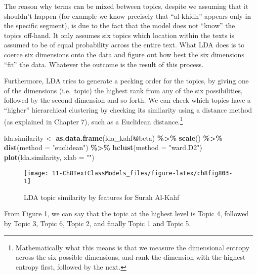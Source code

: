 \documentclass[
]{article}
\newenvironment{Shaded}{\begin{snugshade}}{\end{snugshade}}
\newcommand{\AttributeTok}[1]{\textcolor[rgb]{0.13,0.29,0.53}{#1}}
\newcommand{\FunctionTok}[1]{\textcolor[rgb]{0.13,0.29,0.53}{\textbf{#1}}}
\newcommand{\NormalTok}[1]{#1}
\newcommand{\OtherTok}[1]{\textcolor[rgb]{0.56,0.35,0.01}{#1}}
\newcommand{\SpecialCharTok}[1]{\textcolor[rgb]{0.81,0.36,0.00}{\textbf{#1}}}
\newcommand{\StringTok}[1]{\textcolor[rgb]{0.31,0.60,0.02}{#1}}
\begin{document}
The reason why terms can be mixed between topics, despite we assuming that it shouldn't happen (for example we know precisely that ``al-khidh'' appears only in the specific segment), is due to the fact that the model does not ``know'' the topics off-hand. It only assumes six topics which location within the texts is assumed to be of equal probability across the entire text. What LDA does is to coerce six dimensions onto the data and figure out how best the six dimensions ``fit'' the data. Whatever the outcome is the result of this process.

Furthermore, LDA tries to generate a pecking order for the topics, by giving one of the dimensions (i.e.~topic) the highest rank from any of the six possibilities, followed by the second dimension and so forth. We can check which topics have a ``higher'' hierarchical clustering by checking its similarity using a distance method (as explained in Chapter 7), such as a Euclidean distance.\footnote{Mathematically what this means is that we measure the dimensional entropy across the six possible dimensions, and rank the dimension with the highest entropy first, followed by the next.}

\begin{Shaded}
\begin{Highlighting}[]
\NormalTok{lda.similarity }\OtherTok{\textless{}{-}} \FunctionTok{as.data.frame}\NormalTok{(lda\_kahf}\SpecialCharTok{@}\NormalTok{beta) }\SpecialCharTok{\%\textgreater{}\%}
  \FunctionTok{scale}\NormalTok{() }\SpecialCharTok{\%\textgreater{}\%}
  \FunctionTok{dist}\NormalTok{(}\AttributeTok{method =} \StringTok{"euclidean"}\NormalTok{) }\SpecialCharTok{\%\textgreater{}\%}
  \FunctionTok{hclust}\NormalTok{(}\AttributeTok{method =} \StringTok{"ward.D2"}\NormalTok{)}
\FunctionTok{plot}\NormalTok{(lda.similarity, }\AttributeTok{xlab =} \StringTok{""}\NormalTok{)}
\end{Highlighting}
\end{Shaded}

\begin{figure}

{\centering \texttt{[image: 11-Ch8TextClassModels\_files/figure-latex/ch8fig803-1]} 

}

\caption{LDA topic similarity by features for Surah Al-Kahf}\label{fig:ch8fig803}
\end{figure}

From Figure \ref{fig:ch8fig803}, we can say that the topic at the highest level is Topic 4, followed by Topic 3, Topic 6, Topic 2, and finally Topic 1 and Topic 5.
\end{document}
